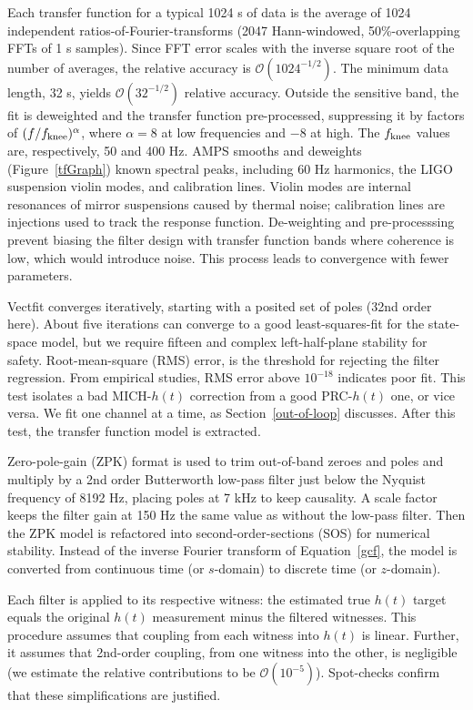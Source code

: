 Each transfer function for a typical 1024 s of data is the average of 1024 independent ratios-of-Fourier-transforms (2047 Hann-windowed, 50\%-overlapping FFTs of 1 s samples). Since FFT error scales with the inverse square root of the number of averages, the relative accuracy is $\mathcal{O}\left(1024^{-1/2}\right)$. The minimum data length, 32 s, yields $\mathcal{O}\left(32^{-1/2}\right)$ relative accuracy. Outside the sensitive band, the fit is deweighted and the transfer function pre-processed, suppressing it by factors of $(f/f_\textup{knee})^\alpha$, where $\alpha = 8$ at low frequencies and $-8$ at high. The $f_\textup{knee}$ values are, respectively, 50 and 400 Hz. AMPS smooths and deweights (Figure~\ref{tfGraph}) known spectral peaks, including 60 Hz harmonics, the LIGO suspension violin modes, and calibration lines. Violin modes are internal resonances of mirror suspensions caused by thermal noise; calibration lines are injections used to track the response function. De-weighting and pre-processsing prevent biasing the filter design with transfer function bands where coherence is low, which would introduce noise. This process leads to convergence with fewer parameters.

 Vectfit converges iteratively, starting with a posited set of poles (32nd order here). About five iterations can converge to a good least-squares-fit for the state-space model, but we require fifteen and complex left-half-plane stability for safety. Root-mean-square (RMS) error, is the threshold for rejecting the filter regression. 
From empirical studies, RMS error above $10^{-18}$ indicates poor fit. 
This test isolates a bad MICH-$h(t)$ correction from a good PRC-$h(t)$ one, or vice versa. 
	We fit one channel at a time, as Section~\ref{out-of-loop} discusses. After this test, the transfer function model is extracted. 

Zero-pole-gain (ZPK) format is used to trim out-of-band zeroes and poles and multiply by a 2nd order Butterworth low-pass filter just below the Nyquist frequency of 8192 Hz, placing poles at 7 kHz to keep causality. A scale factor keeps the filter gain at 150 Hz the same value as without the low-pass filter. Then the ZPK model is refactored into second-order-sections (SOS) for numerical stability. Instead of the inverse Fourier transform of Equation~\ref{gcf}, the model is converted from continuous time (or $s$-domain) to discrete time (or $z$-domain). 

Each filter is applied to its respective witness: the estimated true $h(t)$ target equals the original $h(t)$ measurement minus the filtered witnesses. 
This procedure assumes that coupling from each witness into $h(t)$ is linear. Further, it assumes that 2nd-order coupling, from one witness into the other, is negligible (we estimate the relative contributions to be $\mathcal{O}(10^{-5})$). Spot-checks confirm that these simplifications are justified.  

